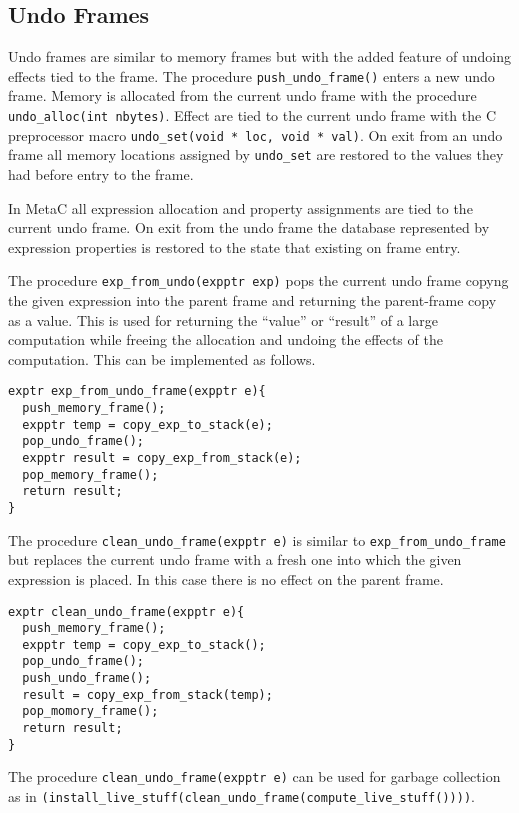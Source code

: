 \documentclass{article}
\begin{document}
\subsection{Undo Frames}
Undo frames are similar to memory frames but with the added feature of undoing effects tied to the frame.
The procedure {\tt push\_undo\_frame()} enters a new undo frame.
Memory is allocated from the current undo frame
with the procedure {\tt undo\_alloc(int nbytes)}.  Effect are tied to the current undo frame with the C preprocessor macro
{\tt undo\_set(void * loc, void * val)}.  On exit from an undo frame all memory locations assigned by {\tt undo\_set} are restored to the values
they had before entry to the frame.

In MetaC all expression allocation and property assignments are tied to the current undo frame.
On exit from the undo frame the database represented by expression properties is restored to
the state that existing on frame entry.

The procedure {\tt exp\_from\_undo(expptr exp)} pops the current
undo frame copyng the given expression into the parent frame and returning the parent-frame copy as a value.
This is used for returning the ``value'' or ``result'' of a large computation while freeing the allocation and undoing the effects of the computation.
This can be implemented as follows.

\begin{verbatim}
exptr exp_from_undo_frame(expptr e){
  push_memory_frame();
  expptr temp = copy_exp_to_stack(e);
  pop_undo_frame();
  expptr result = copy_exp_from_stack(e);
  pop_memory_frame();
  return result;
}
\end{verbatim}

The procedure {\tt clean\_undo\_frame(expptr e)} is similar to {\tt exp\_from\_undo\_frame} but replaces the current undo frame with a fresh one
into which the given expression is placed.  In this case there is no effect on the parent frame.

\begin{verbatim}
exptr clean_undo_frame(expptr e){
  push_memory_frame();
  expptr temp = copy_exp_to_stack();
  pop_undo_frame();
  push_undo_frame();
  result = copy_exp_from_stack(temp);
  pop_momory_frame();
  return result; 
}
\end{verbatim}

The procedure {\tt clean\_undo\_frame(expptr e)} can be used for garbage collection
as in {\tt (install\_live\_stuff(clean\_undo\_frame(compute\_live\_stuff())))}.
\end{document}
